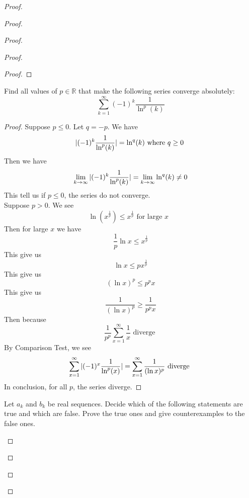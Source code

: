 \documentclass{report}
\begin{document}
\begin{proof}
\begin{proof}
\begin{proof}
\begin{proof}
\begin{proof}
\end{proof}

\begin{question}{}{}
Find all values of \( p \in \mathbb{R} \) that make the following series converge absolutely:
\[
\sum_{k=1}^{\infty} (-1)^k \frac{1}{\ln^p (k)}
\]
\end{question}
\begin{proof}
Suppose $p\leq 0$. Let $q=-p$. We have
 \begin{equation*}
|(-1)^k \frac{1}{\ln^p(k)}|=\ln^q (k)\text{ where $q\geq 0$ }
\end{equation*}
Then we have
\begin{equation*}
\lim_{k\to\infty} |(-1)^k \frac{1}{\ln^p (k)}|= \lim_{k\to\infty}\ln^q (k)\neq 0
\end{equation*}
This tell us if $p\leq 0$, the series do not converge.\\

Suppose $p>0$. We see 
 \begin{equation*}
\ln(x^{\frac{1}{p}})\leq  x^{\frac{1}{p}}\text{ for large $x$ }
\end{equation*}
Then for large $x$ we have
 \begin{equation*}
\frac{1}{p}\ln x\leq x^{\frac{1}{p}}
\end{equation*}
This give us
\begin{equation*}
\ln x\leq  px^{\frac{1}{p}}
\end{equation*}
This give us
\begin{equation*}
  (\ln x)^p\leq p^p x
\end{equation*}
This give us 
\begin{equation*}
\frac{1}{ (\ln x)^p}\geq \frac{1}{p^px}
\end{equation*}
Then because 
\begin{equation*}
\frac{1}{p^p}\sum_{x=1}^\infty \frac{1}{x}\text{ diverge }
\end{equation*}
By Comparison Test, we see 
\begin{equation*}
\sum_{x=1}^\infty |(-1)^x \frac{1}{\ln^p (x)}|=\sum_{x=1}^\infty \frac{1}{(\ln x)^p}\text{ diverge }
\end{equation*}
In conclusion, for all $p$, the series diverge.
\end{proof}

\begin{question}{}{}
Let \( a_k \) and \( b_k \) be real sequences. Decide which of the following statements are true and which are false. Prove the true ones and give counterexamples to the false ones.


\end{question}
\end{proof}
\end{proof}
\end{proof}
\end{proof}
\end{document}
